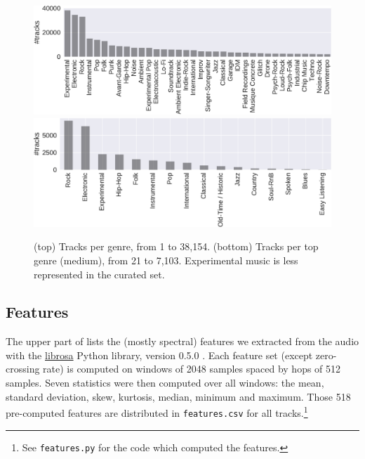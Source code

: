 \documentclass{article}
\begin{document}

\begin{figure}[t]
	\centering
	\includegraphics[width=\linewidth]{genre_distribution.pdf}
	\\ \vspace{1em}
	\includegraphics[width=\linewidth]{genre_top_distribution.pdf}
	\caption{(top) Tracks per genre, from 1 to 38,154.
	(bottom) Tracks per top genre (medium), from 21 to 7,103.
	Experimental music is less represented in the curated set.}
	\label{fig:genre_distribution}
	\label{fig:genre_top_distribution}
\end{figure}

\subsection{Features} %

The upper part of  lists the (mostly spectral) features we extracted from the audio with the \href{https://github.com/librosa/librosa}{librosa} Python library, version 0.5.0 \cite{librosa}.
Each feature set (except zero-crossing rate) is computed on windows of 2048 samples spaced by hops of 512 samples. Seven statistics were then computed over all windows: the mean, standard deviation, skew, kurtosis, median, minimum and maximum.
Those 518 pre-computed features are distributed in \texttt{features.csv} for all tracks.\footnote{See \texttt{features.py} for the code which computed the features.}
\end{document}
